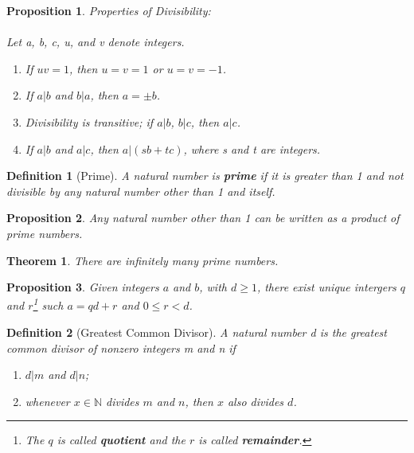 \documentclass[12pt]{article}
\newtheorem{definition}{Definition}[subsection]
\newtheorem{theorem}{Theorem}[subsection]
\newtheorem{proposition}{Proposition}[subsection]
\begin{document}
    \begin{proposition}
        Properties of Divisibility:\\\\
        Let a, b, c, u, and v denote integers.\\
        \begin{enumerate}
            \item If $uv = 1$, then $u = v = 1$ or $u = v = -1$.
            \item If $a|b$ and $b|a$, then $a = \pm b$.
            \item Divisibility is transitive; if $a|b$, $b|c$, then $a|c$.
            \item If $a|b$ and $a|c$, then $a | (sb+tc)$, where s and t are integers.
        \end{enumerate}

    \end{proposition}
    \begin{definition}[Prime]
        A natural number is \textbf{prime} if it is greater than 1 and not divisible by any natural number other than 1 and itself.
    \end{definition}
    \begin{proposition}
        Any natural number other than 1 can be written as a product of prime numbers.
    \end{proposition}
    \begin{theorem}
        There are infinitely many prime numbers.
    \end{theorem}
    \begin{proposition}
        Given integers $a$ and $b$, with $d \geq 1$, there exist unique intergers $q$ and $r$\footnote{The $q$ is called \textbf{quotient} and the $r$ is called \textbf{remainder}.} such $a = qd + r$ and $0 \leq r < d$.
    \end{proposition}
    \begin{definition}[Greatest Common Divisor]
        A natural number d is the greatest common divisor of nonzero integers m and n if\\
        \begin{enumerate}
            \item $d | m$ and $d | n$;
            \item whenever $x \in \mathbb{N}$ divides $m$ and $n$, then $x$ also divides $d$.
        \end{enumerate}
    \end{definition}
\end{document}
